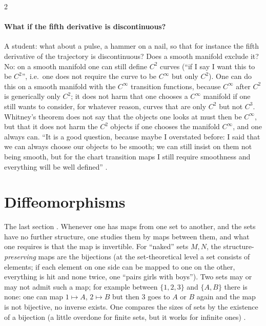 \begin{paracol}{2}
\paragraph{What if the fifth derivative is discontinuous?} A student: what about a pulse, a hammer on a nail, so that for instance the fifth derivative of the trajectory is discontinuous? Does a smooth manifold exclude it? No: on a smooth manifold one can still define $C^2$ curves
(``if I say I want this to be $C^2$'', i.e.\ one does not require the curve to be $C^\infty$ but only $C^2$). One can do this on a smooth manifold with the $C^\infty$ transition functions, because $C^\infty$ after $C^2$ is generically only $C^2$; it does not harm that one chooses a $C^\infty$ manifold if one still wants to consider, for whatever reason,
curves that are only $C^2$ but not $C^3$. Whitney's theorem does not say that the objects one looks at must then be $C^\infty$, but that it does not harm the $C^2$ objects if one chooses the manifold $C^\infty$, and one always can. ``It is a good question, because maybe I overstated before: I said that we can always choose our objects to be smooth;
we can still insist on them not being smooth, but for the chart transition maps I still require smoothness and everything will be well defined'' .

\section{Diffeomorphisms}\label{sec:c04-diffeo}

The last section . Whenever one has maps from one set to another, and the sets have no further structure, one studies them by maps between them, and what one requires is that the map is invertible.
For ``naked'' sets $M,N$, the structure-\emph{preserving} maps are the bijections (at the set-theoretical level a set consists of elements; if each element on one side can be mapped to one on the other, everything is hit and none twice, one ``pairs girls with boys''). Two sets may or may not admit such a map;
for example between $\{1,2,3\}$ and $\{A,B\}$ there is none: one can map $1\mapsto A$, $2\mapsto B$ but then $3$ goes to $A$ or $B$ again and the map is not bijective, no inverse exists. One compares the sizes of sets by the existence of a bijection (a little overdone for finite sets, but it works for infinite ones)
.


\end{paracol}
